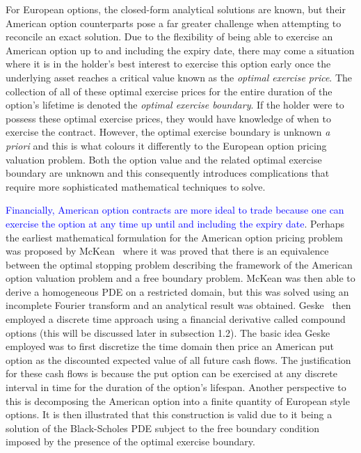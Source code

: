 For European options, the closed-form analytical solutions are known, but their American option counterparts pose a far greater challenge when attempting to reconcile an exact solution. Due to the flexibility of being able to exercise an American option up to and including the expiry date, there may come a situation where it is in the holder's best interest to exercise this option early once the underlying asset reaches a critical value known as the \emph{optimal exercise price}. The collection of all of these optimal exercise prices for the entire duration of the option's lifetime is denoted the \emph{optimal exercise boundary}. If the holder were to possess these optimal exercise prices, they would have knowledge of when to exercise the contract. However, the optimal exercise boundary is unknown \emph{a priori} and this is what colours it differently to the European option pricing valuation problem. Both the option value and the related optimal exercise boundary are unknown and this consequently introduces complications that require more sophisticated mathematical techniques to solve.

\textcolor{blue}{Financially, American option contracts are more ideal to trade because one can exercise the option at any time up until and including the expiry date}. Perhaps the earliest mathematical formulation for the American option pricing problem was proposed by McKean~\cite{McKean1965} where it was proved that there is an equivalence between the optimal stopping problem describing the framework of the American option valuation problem and a free boundary problem. McKean was then able to derive a homogeneous PDE on a restricted domain, but this was solved using an incomplete Fourier transform and an analytical result was obtained. Geske~\cite{Geske1984} then employed a discrete time approach using a financial derivative called compound options (this will be discussed later in subsection 1.2). The basic idea Geske employed was to first discretize the time domain then price an American put option as the discounted expected value of all future cash flows. The justification for these cash flows is because the put option can be exercised at any discrete interval in time for the duration of the option's lifespan. Another perspective to this is decomposing the American option into a finite quantity of European style options. It is then illustrated that this construction is valid due to it being a solution of the Black-Scholes PDE subject to the free boundary condition imposed by the presence of the optimal exercise boundary.

